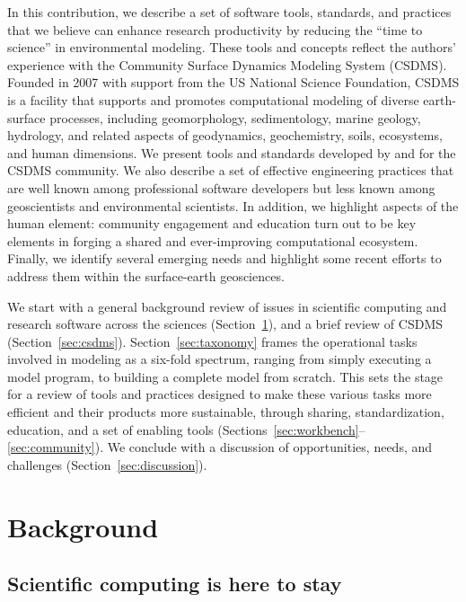 \documentclass[12pt]{amsart}
\begin{document}
In this contribution, we describe a set of software tools, standards, and practices that we believe can enhance research productivity by reducing the ``time to science'' in environmental modeling. These tools and concepts reflect the authors' experience with the Community Surface Dynamics Modeling System (CSDMS). Founded in 2007 with support from the US National Science Foundation, CSDMS is a facility that supports and promotes computational modeling of diverse earth-surface processes, including geomorphology, sedimentology, marine geology, hydrology, and related aspects of geodynamics, geochemistry, soils, ecosystems, and human dimensions. We present tools and standards developed by and for the CSDMS community. We also describe a set of effective engineering practices that are well known among professional software developers but less known among geoscientists and environmental scientists. In addition, we highlight aspects of the human element: community engagement and education turn out to be key elements in forging a shared and ever-improving computational ecosystem. Finally, we identify several emerging needs and highlight some recent efforts to address them within the surface-earth geosciences.

We start with a general background review of issues in scientific computing and research software across the sciences (Section~\ref{sec:background}), and a brief review of CSDMS (Section~\ref{sec:csdms}). Section~\ref{sec:taxonomy} frames the operational tasks involved in modeling as a six-fold spectrum, ranging from simply executing a model program, to building a complete model from scratch. This sets the stage for a review of tools and practices designed to make these various tasks more efficient and their products more sustainable, through sharing, standardization, education, and a set of enabling tools (Sections~\ref{sec:workbench}--\ref{sec:community}). We conclude with a discussion of opportunities, needs, and challenges (Section~\ref{sec:discussion}).


\section{Background}
\label{sec:background}

\subsection{Scientific computing is here to stay}
\end{document}
